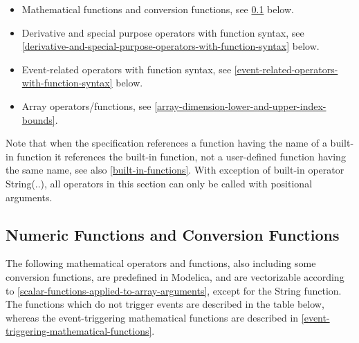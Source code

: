 \documentclass[10pt,a4paper]{report}
\def\doublelabel#1{\label{#1}}
\begin{document}
\begin{itemize}
\item
  Mathematical functions and conversion functions, see \ref{numeric-functions-and-conversion-functions}
  below.
\item
  Derivative and special purpose operators with function syntax, see
  \ref{derivative-and-special-purpose-operators-with-function-syntax} below.
\item
  Event-related operators with function syntax, see \ref{event-related-operators-with-function-syntax} below.
\item
  Array operators/functions, see \ref{array-dimension-lower-and-upper-index-bounds}.
\end{itemize}

Note that when the specification references a function having the name
of a built-in function it references the built-in function, not a
user-defined function having the same name, see also \ref{built-in-functions}. With
exception of built-in operator String(..), all operators in this section
can only be called with positional arguments.

\subsection{Numeric Functions and Conversion Functions}\doublelabel{numeric-functions-and-conversion-functions}

The following mathematical operators and functions, also including some
conversion functions, are predefined in Modelica, and are vectorizable
according to \ref{scalar-functions-applied-to-array-arguments}, except for the String function. The
functions which do not trigger events are described in the table below,
whereas the event-triggering mathematical functions are described in
\ref{event-triggering-mathematical-functions}.
\end{document}
